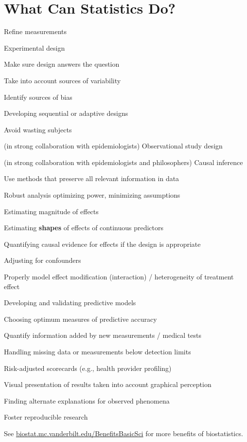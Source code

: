 \section{What Can Statistics Do?}
\bi
\item Refine measurements
\item Experimental design
  \bi
  \item Make sure design answers the question
  \item Take into account sources of variability
  \item Identify sources of bias
  \item Developing sequential or adaptive designs
  \item Avoid wasting subjects
    \ei
\item {\smaller (in strong collaboration with epidemiologists)} Observational
  study design
\item {\smaller (in strong collaboration with epidemiologists and
  philosophers)} Causal inference
\item Use methods that preserve all relevant information in data
\item Robust analysis optimizing power, minimizing assumptions
\item Estimating magnitude of effects
\item Estimating \textbf{shapes} of effects of continuous predictors
\item Quantifying causal evidence for effects if the design is appropriate
\item Adjusting for confounders
\item Properly model effect modification (interaction) / heterogeneity
  of treatment effect
\item Developing and validating predictive models
\item Choosing optimum measures of predictive accuracy
\item Quantify information added by new measurements / medical tests
\item Handling missing data or measurements below detection limits
\item Risk-adjusted scorecards (e.g., health provider profiling)
\item Visual presentation of results taken into account graphical
  perception
\item Finding alternate explanations for observed phenomena
\item Foster reproducible research
\ei   

See
\href{http://biostat.mc.vanderbilt.edu/BenefitsBasicSci}{biostat.mc.vanderbilt.edu/BenefitsBasicSci}
for more benefits of biostatistics.

